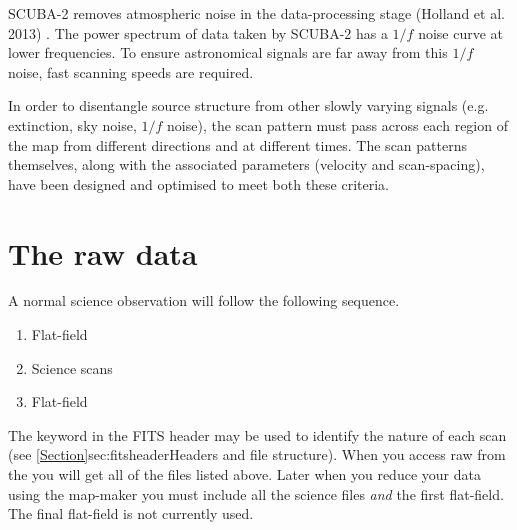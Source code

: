SCUBA-2 removes atmospheric noise in the data-processing
stage (Holland et al. 2013) \cite{s2main}. The power spectrum
of data taken by SCUBA-2 has a $1/f$ noise curve at lower frequencies. To
ensure astronomical signals are far away from this $1/f$ noise, fast
scanning speeds are required.

In order to disentangle source structure from other
slowly varying signals (e.g. extinction, sky noise, $1/f$ noise), the
scan pattern must pass across each region of the map from different
directions and at different times. The scan patterns themselves, along
with the associated parameters (velocity and scan-spacing), have been
designed and optimised to meet both these criteria.



\section{The raw data}
\label{sec:rawdata}
A normal science observation will follow the following sequence.

\begin{enumerate}\itemsep-0.2em
\item Flat-field
\item Science scans
\item Flat-field
\end{enumerate}

The  keyword in the FITS header may be used to
identify the nature of each scan (see
\cref{Section}{sec:fitsheader}{Headers and file structure}).  When you
access raw from the  you
will get all of the files listed above. Later when you reduce your
data using the map-maker you must include all the science files
\emph{and} the first flat-field.  The final flat-field is not
currently used.

